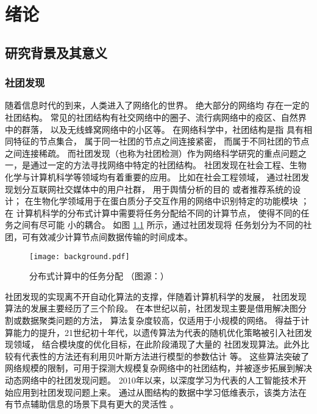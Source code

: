 
\chapter{绪论}


\section{研究背景及其意义}
\subsection{社团发现}\label{sec:community}
随着信息时代的到来，人类进入了网络化的世界。
绝大部分的网络均
存在一定的社团结构\cite{wang2012network}。
常见的社团结构有社交网络中的圈子、流行病网络中的疫区、自然界中的群落，
以及无线蜂窝网络中的小区等。
在网络科学中，社团结构是指
具有相同特征的节点集合， 属于同一社团的节点之间连接紧密，
而属于不同社团的节点之间连接稀疏。
而社团发现（也称为社团检测）作为网络科学研究的重点问题之一，是通过一定的方法寻找网络中特定的社团结构。
社团发现在社会工程、生物化学与计算机科学等领域均有着重要的应用。
比如在社会工程领域，
通过社团发现划分互联网社交媒体中的用户社群\cite{zalmout2013twitter}，
用于舆情分析的目的\cite{yang2018opinion}
或者推荐系统的设计\cite{cao2015recommendation}；
在生物化学领域用于在蛋白质分子交互作用的网络中识别特定的功能模块 \cite{ayati2015mobas}；
在
计算机科学的分布式计算中需要将任务分配给不同的计算节点，
使得不同的任务之间有尽可能
小的耦合\cite{topcuoglu2002performance}。
如图 \ref{fig:distributed_computing} 所示，通过社团发现将
任务划分为不同的社团，可有效减少计算节点间数据传输的时间成本。

\begin{figure}[!ht]
    \centering
    \texttt{[image: background.pdf]}
    \caption{分布式计算中的任务分配 （图源：）}
    \label{fig:distributed_computing}
\end{figure}


社团发现的实现离不开自动化算法的支撑，伴随着计算机科学的发展，
社团发现算法的发展主要经历了三个阶段。
在本世纪以前，社团发现主要是借用解决图分割或数据聚类问题的方法，
算法复杂度较高，仅适用于小规模的网络。
得益于计算能力的提升，21世纪初十年代，以遗传算法为代表的随机优化策略被引入社团发现领域，
结合模块度的优化目标，在此阶段涌现了大量的
社团发现算法。此外比较有代表性的方法还有利用贝叶斯方法进行模型的参数估计 \cite{jin2023survey}
等。
这些算法突破了网络规模的限制，可用于探测大规模复杂网络中的社团结构，并被逐步拓展到解决动态网络中的社团发现问题。
2010年以来，以深度学习为代表的人工智能技术开始应用到社团发现问题上来。
通过从图结构的数据中学习低维表示，该类方法在有节点辅助信息的场景下具有更大的灵活性
\cite{Su_2022}。

